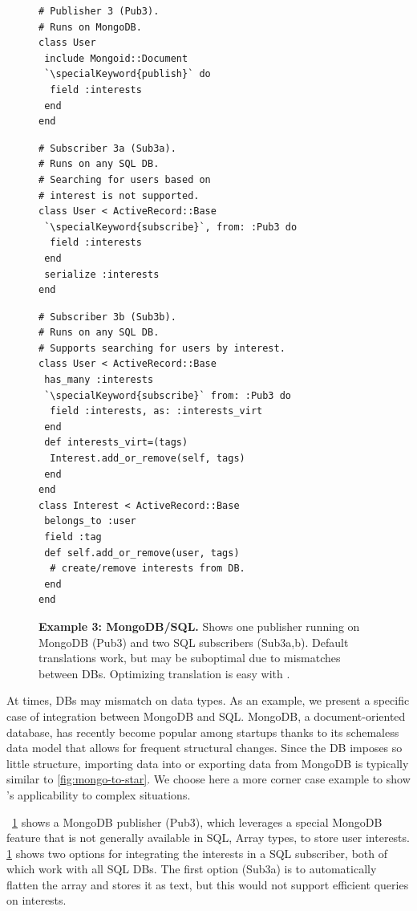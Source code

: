 \begin{figure}
\begin{minipage}{.45\textwidth}
\begin{lstlisting}[framexleftmargin=5pt]
# Publisher 3 (Pub3).
# Runs on MongoDB.
class User
 include Mongoid::Document
 `\specialKeyword{publish}` do
  field :interests
 end
end
\end{lstlisting}
\begin{lstlisting}[framexleftmargin=5pt]
# Subscriber 3a (Sub3a).
# Runs on any SQL DB.
# Searching for users based on
# interest is not supported.
class User < ActiveRecord::Base
 `\specialKeyword{subscribe}`, from: :Pub3 do
  field :interests
 end
 serialize :interests
end
\end{lstlisting}
\end{minipage}\hfill
\begin{minipage}{.45\textwidth}
\begin{lstlisting}[framexleftmargin=5pt]
# Subscriber 3b (Sub3b).
# Runs on any SQL DB.
# Supports searching for users by interest.
class User < ActiveRecord::Base
 has_many :interests
 `\specialKeyword{subscribe}` from: :Pub3 do
  field :interests, as: :interests_virt
 end
 def interests_virt=(tags)
  Interest.add_or_remove(self, tags)
 end
end
class Interest < ActiveRecord::Base
 belongs_to :user
 field :tag
 def self.add_or_remove(user, tags)
  # create/remove interests from DB.
 end
end
\end{lstlisting}
\end{minipage}
\caption{{\bf Example 3: MongoDB/SQL.}
Shows one publisher running on MongoDB (Pub3) and two SQL subscribers
(Sub3a,b).  Default translations work, but may be suboptimal due to
mismatches between DBs.  Optimizing translation is easy with \synapse.
}
\label{fig:mongo-sql}
\end{figure}

At times, DBs may mismatch on data types.  As an example, we present a specific
case of integration between MongoDB and SQL.
MongoDB, a document-oriented database, has recently become popular among startups
 thanks to its schemaless data model that allows for frequent
structural changes.  Since the DB imposes so little structure, importing data
into or exporting data from MongoDB is typically similar to
\F\ref{fig:mongo-to-star}.  We choose here a more corner case example to
show \synapse's applicability to complex situations.

\F~\ref{fig:mongo-sql} shows a MongoDB publisher (Pub3), which leverages a
special MongoDB feature that is not generally available in SQL,
Array types, to store user interests.  \F\ref{fig:mongo-sql} shows two options
for integrating the interests in a SQL subscriber, both of which work with all SQL DBs. 
The first option (Sub3a) is to automatically flatten the array and stores it as text, but this would not support efficient queries on interests.  

